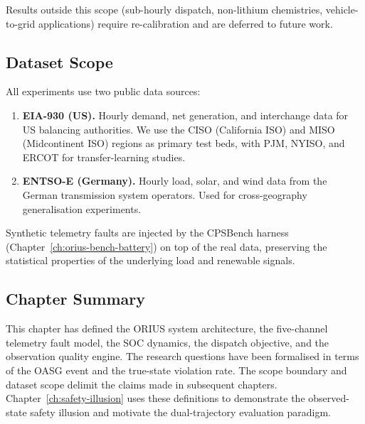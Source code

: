 Results outside this scope (sub-hourly dispatch, non-lithium chemistries,
vehicle-to-grid applications) require re-calibration and are deferred to
future work.

\subsection{Dataset Scope}
\label{sec:dataset-scope}

All experiments use two public data sources:

\begin{enumerate}
  \item \textbf{EIA-930 (US).}  Hourly demand, net generation, and
    interchange data for US balancing authorities.  We use the CISO
    (California ISO) and MISO (Midcontinent ISO) regions as primary test
    beds, with PJM, NYISO, and ERCOT for transfer-learning studies.
  \item \textbf{ENTSO-E (Germany).}  Hourly load, solar, and wind data
    from the German transmission system operators.  Used for
    cross-geography generalisation experiments.
\end{enumerate}

Synthetic telemetry faults are injected by the CPSBench harness
(Chapter~\ref{ch:orius-bench-battery}) on top of the real data,
preserving the statistical properties of the underlying load and renewable
signals.

\subsection{Chapter Summary}

This chapter has defined the ORIUS system architecture, the
five-channel telemetry fault model, the SOC dynamics, the dispatch
objective, and the observation quality engine.  The research questions
have been formalised in terms of the OASG event and the true-state
violation rate.  The scope boundary and dataset scope delimit the claims
made in subsequent chapters.  Chapter~\ref{ch:safety-illusion} uses these
definitions to demonstrate the observed-state safety illusion and motivate
the dual-trajectory evaluation paradigm.
